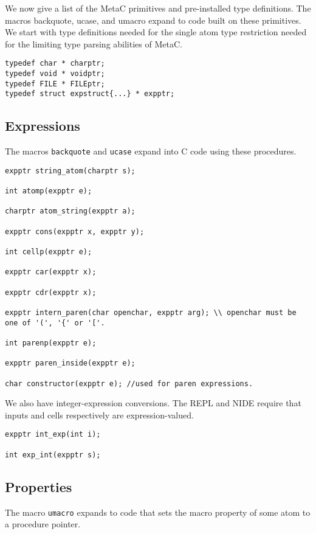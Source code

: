 \documentclass{article}
\begin{document}
We now give a list of the MetaC primitives and pre-installed type definitions.  The macros backquote, ucase, and umacro expand to code built on these primitives.
We start with type definitions needed for the single atom type restriction needed for the limiting type parsing abilities of MetaC.

\begin{verbatim}
typedef char * charptr;
typedef void * voidptr;
typedef FILE * FILEptr;
typedef struct expstruct{...} * expptr;
\end{verbatim}

\subsection{Expressions}

The macros {\tt backquote} and {\tt ucase} expand into C code using these procedures.

\begin{verbatim}
expptr string_atom(charptr s);

int atomp(expptr e);

charptr atom_string(expptr a);

expptr cons(expptr x, expptr y);

int cellp(expptr e);

expptr car(expptr x);

expptr cdr(expptr x);

expptr intern_paren(char openchar, expptr arg); \\ openchar must be one of '(', '{' or '['.

int parenp(expptr e);

expptr paren_inside(expptr e);

char constructor(expptr e); //used for paren expressions.
\end{verbatim}

We also have integer-expression conversions.  The REPL and NIDE require that inputs and cells respectively are expression-valued.

\begin{verbatim}
expptr int_exp(int i);

int exp_int(expptr s);
\end{verbatim}

\subsection{Properties}

The macro {\tt umacro} expands to code that
sets the macro property of some atom to a procedure pointer.
\end{document}
